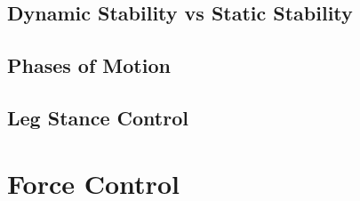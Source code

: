 \subsection{Dynamic Stability vs Static Stability}
\subsection{Phases of Motion}
\subsection{Leg Stance Control}
\section{Force Control}
